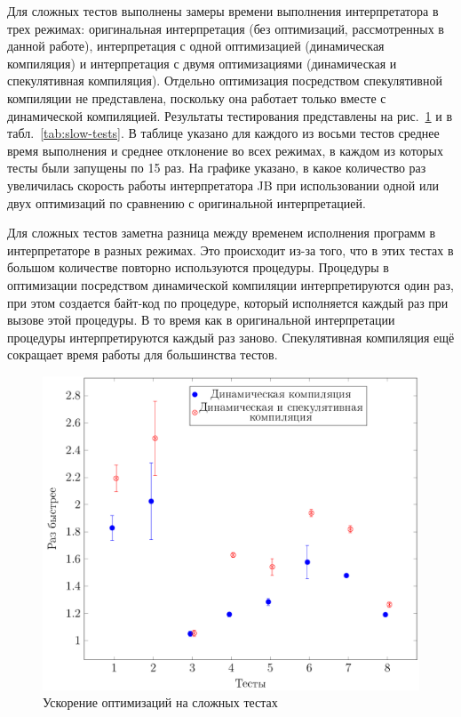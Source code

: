 \documentclass[14pt]{extarticle}
\begin{document}
	Для сложных тестов выполнены замеры времени выполнения интерпретатора в трех режимах: оригинальная интерпретация (без оптимизаций, рассмотренных в данной работе), интерпретация с одной оптимизацией (динамическая компиляция) и интерпретация с двумя оптимизациями (динамическая и спекулятивная компиляция). Отдельно оптимизация посредством спекулятивной компиляции не представлена, поскольку она работает только вместе с динамической компиляцией. Результаты тестирования представлены на  рис.~\ref{graphic: slow} и в табл.~\ref{tab:slow-tests}.
	В таблице указано для каждого из восьми тестов среднее время выполнения и среднее отклонение во всех режимах, в каждом из которых тесты были запущены по 15 раз. На графике указано, в какое количество раз увеличилась скорость работы интерпретатора JB при использовании одной или двух оптимизаций по сравнению с оригинальной интерпретацией. 
	
	Для сложных тестов заметна разница между временем исполнения программ в интерпретаторе в разных режимах. Это происходит из-за того, что в этих тестах в большом количестве повторно используются процедуры. Процедуры в оптимизации посредством динамической компиляции интерпретируются один раз, при этом создается байт-код по процедуре, который исполняется каждый раз при вызове этой процедуры. В то время как в оригинальной интерпретации процедуры интерпретируются каждый раз заново. Спекулятивная компиляция ещё сокращает время работы для большинства тестов.
		\begin{figure} [h]
			\includegraphics[width=0.87\linewidth]{TimesGraphic.png}
			\caption{Ускорение оптимизаций на сложных тестах}\label{graphic: slow}
		\end{figure}	
		
\end{document}

